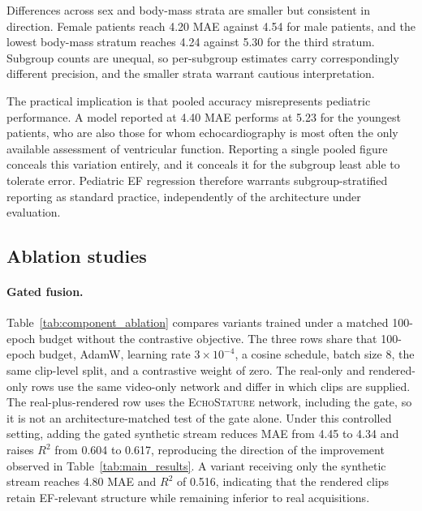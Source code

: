 \documentclass{ws-procs11x85}
\begin{document}
Differences across sex and body-mass strata are smaller but consistent in direction.
Female patients reach 4.20 MAE against 4.54 for male patients, and the lowest body-mass stratum reaches 4.24 against 5.30 for the third stratum.
Subgroup counts are unequal, so per-subgroup estimates carry correspondingly different precision, and the smaller strata warrant cautious interpretation.

The practical implication is that pooled accuracy misrepresents pediatric performance.
A model reported at 4.40 MAE performs at 5.23 for the youngest patients, who are also those for whom echocardiography is most often the only available assessment of ventricular function.\cite{reddy2023echonetpeds}
Reporting a single pooled figure conceals this variation entirely, and it conceals it for the subgroup least able to tolerate error.
Pediatric EF regression therefore warrants subgroup-stratified reporting as standard practice, independently of the architecture under evaluation.

\subsection{Ablation studies}

\paragraph{Gated fusion.}
Table~\ref{tab:component_ablation} compares variants trained under a matched 100-epoch budget without the contrastive objective. {\color{red}The three rows share that 100-epoch budget, AdamW, learning rate \(3\times 10^{-4}\), a cosine schedule, batch size 8, the same clip-level split, and a contrastive weight of zero. The real-only and rendered-only rows use the same video-only network and differ in which clips are supplied. The real-plus-rendered row uses the \textsc{EchoStature} network, including the gate, so it is not an architecture-matched test of the gate alone.}
Under this controlled setting, adding the gated synthetic stream reduces MAE from 4.45 to 4.34 and raises $R^2$ from 0.604 to 0.617, reproducing the direction of the improvement observed in Table~\ref{tab:main_results}.
A variant receiving only the synthetic stream reaches 4.80 MAE and $R^2$ of 0.516, indicating that the rendered clips retain EF-relevant structure while remaining inferior to real acquisitions.
\end{document}
